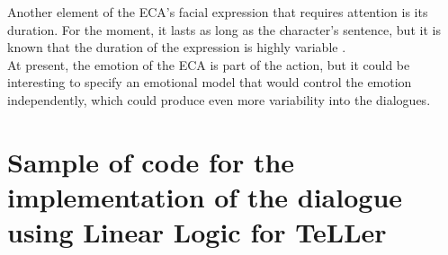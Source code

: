 \documentclass[11pt]{article}
\begin{document}
Another element of the ECA's facial expression that requires attention is its duration. For the moment, it lasts as long as the character's sentence, but it is known that the duration of the expression is highly variable \citep{Verduyn09}. \\

At present, the emotion of the ECA is part of the action, but it could be interesting to specify an emotional model that would control the emotion independently, which could produce even more variability into the dialogues.


\newpage
%



\newpage
\appendix
\section{Sample of code for the implementation of the dialogue using Linear Logic for TeLLer} \label{annexe: Code TeLLer}
\end{document}
